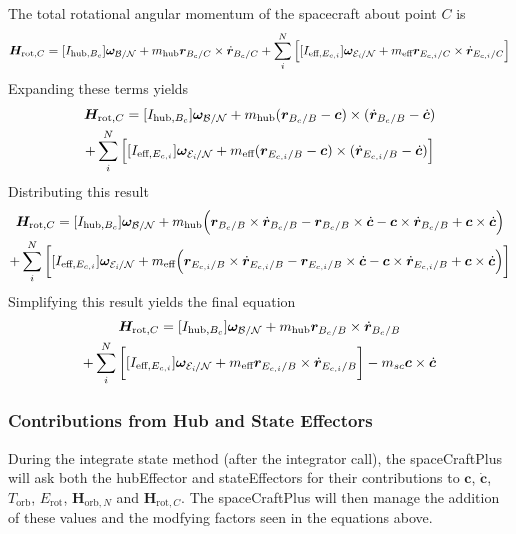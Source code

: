 The total rotational angular momentum of the spacecraft about point $C$ is
\begin{multline}
\bm H_{\text{rot},C} = [I_{\text{hub},B_c}] \bm \omega_{\cal{B/N}} + m_{\text{hub}} \bm r_{B_c/C}\times \dot{\bm r}_{B_c/C}
+ \sum\limits_{i}^{N}\Big[[I_{\text{eff},E_{c,i}}] \bm \omega_{\cal{E}_{\textit{i}}/\cal{N}}
+ m_{\text{eff}} \bm r_{E_{c,i}/C} \times \dot{\bm r}_{E_{c,i}/C} \Big]
\end{multline}
Expanding these terms yields
\begin{multline}
\bm H_{\text{rot},C} = [I_{\text{hub},B_c}] \bm \omega_{\cal{B/N}} + m_{\text{hub}} (\bm r_{B_c/B} - \bm c)\times (\dot{\bm r}_{B_c/B} - \dot{\bm c})\\
+ \sum\limits_{i}^{N}\Big[[I_{\text{eff},E_{c,i}}] \bm \omega_{\cal{E}_{\textit{i}}/\cal{N}}
+ m_{\text{eff}} (\bm r_{E_{c,i}/B} - \bm c) \times (\dot{\bm r}_{E_{c,i}/B} - \dot{\bm c}) \Big]
\end{multline}
Distributing this result
\begin{multline}
\bm H_{\text{rot},C} = [I_{\text{hub},B_c}] \bm \omega_{\cal{B/N}} + m_{\text{hub}} \Big(\bm r_{B_c/B} \times \dot{\bm r}_{B_c/B} - \bm r_{B_c/B} \times \dot{\bm c} - \bm c \times \dot{\bm r}_{B_c/B} + \bm c \times \dot{\bm c}\Big)\\
+ \sum\limits_{i}^{N}\bigg[[I_{\text{eff},E_{c,i}}] \bm \omega_{\cal{E}_{\textit{i}}/\cal{N}}
+ m_{\text{eff}} \Big(\bm r_{E_{c,i}/B} \times \dot{\bm r}_{E_{c,i}/B} - \bm r_{E_{c,i}/B} \times \dot{\bm c} - \bm c \times \dot{\bm r}_{E_{c,i}/B} + \bm c \times \dot{\bm c}\Big) \bigg]
\end{multline}
Simplifying this result yields the final equation
\begin{multline}
\bm H_{\text{rot},C} = [I_{\text{hub},B_c}] \bm \omega_{\cal{B/N}} + m_{\text{hub}} \bm r_{B_c/B} \times \dot{\bm r}_{B_c/B}\\
+ \sum\limits_{i}^{N}\bigg[[I_{\text{eff},E_{c,i}}] \bm \omega_{\cal{E}_{\textit{i}}/\cal{N}}
+ m_{\text{eff}} \bm r_{E_{c,i}/B} \times \dot{\bm r}_{E_{c,i}/B} \bigg] - m_{sc} \bm c \times \dot{\bm c}
\end{multline}

\subsubsection{Contributions from Hub and State Effectors}
During the integrate state method (after the integrator call), the spaceCraftPlus will ask both the hubEffector and stateEffectors for their contributions to $\bm c$, $\dot{\bm c}$, $T_{\text{orb}}$, $E_{\text{rot}}$, $\bm H_{\text{orb},N}$ and $\bm H_{\text{rot},C}$. The spaceCraftPlus will then manage the addition of these values and the modfying factors seen in the equations above. 
